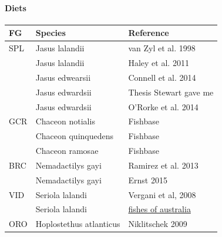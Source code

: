 \documentclass[11pt]{article}
\begin{document}
\paragraph*{Diets}
\label{sec-5-2-1-4}


\begin{center}
\begin{tabular}{lll}
 FG   &  Species                     &  Reference                                                                       \\
\hline
 SPL  &  Jasus lalandii              &  van Zyl et al. 1998                                                             \\
      &  Jasus lalandii              &  Haley et al. 2011                                                               \\
      &  Jasus edwearsii             &  Connell et al. 2014                                                             \\
      &  Jasus edwardsii             &  Thesis Stewart gave me                                                          \\
      &  Jasus edwardsii             &  O'Rorke et al. 2014                                                             \\
\hline
 GCR  &  Chaceon notialis            &  Fishbase                                                                        \\
      &  Chaceon quinquedens         &  Fishbase                                                                        \\
      &  Chaceon ramosae             &  Fishbase                                                                        \\
\hline
 BRC  &  Nemadactilys gayi           &  Ramirez et al. 2013                                                             \\
      &  Nemadactilys gayi           &  Ernst 2015                                                                      \\
\hline
 VID  &  Seriola lalandi             &  Vergani et al,  2008                                                            \\
      &  Seriola lalandi             &  \href{http://fishesofaustralia.net.au/home/species/1662/}{fishes of australia}  \\
\hline
 ORO  &  Hoplostethus atlanticus     &  Niklitschek 2009                                                                \\

\end{tabular}
\end{center}
\end{document}
